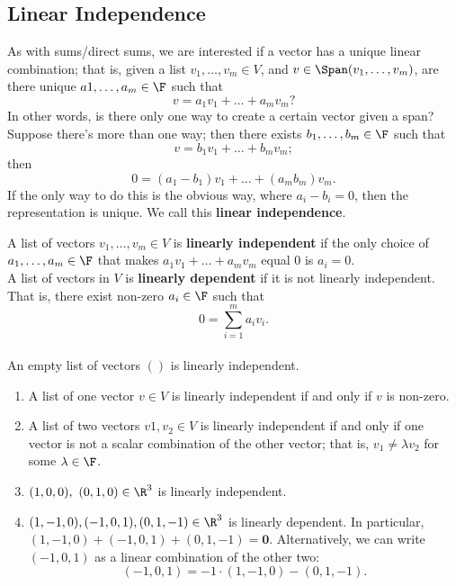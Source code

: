 \documentclass[math0540-lecture-notes.tex]{subfiles}
\begin{document}
\subsection{Linear Independence}

As with sums/direct sums, we are interested if a vector has a unique linear combination; that is,
given a list $v_1,\ldots,v_m\in V$, and $v\in \Span(v_1,\ldots,v_m)$, are there unique $a
1,\ldots,a_m\in \F$ such that \[
  v=a_1v_1+\ldots+a_mv_m
?\] In other words, is there only one way to create a certain vector given a span? Suppose there's
more than one way; then there exists $ b_1,\ldots,b_m\in \F$ such that \[
  v=b_1v_1+\ldots+b_mv_m
;\] then \[
  0 = (a_1-b_1)v_1+\ldots+(a_mb_m)v_m
.\] If the only way to do this is the obvious way, where $a_i-b_i=0$, then the representation is
unique. We call this \textbf{linear independence}.

\begin{definition}{}
  A list of vectors $ v_1,\ldots,v_m\in V$ is \textbf{linearly independent} if the only choice of $
  a_1,\ldots,a_m\in \F$ that makes $  a_1v_1+\ldots+a_mv_m$  equal $0 $ is $a_i=0$.\\

  A list of vectors in $V$ is \textbf{linearly dependent} if it is not linearly independent. That
  is, there exist non-zero $a_i \in \F$ such that \[
    0 = \sum_{i=1}^{m} a_iv_i
  .\]\\ 

  An empty list of vectors $()$ is linearly independent.
\end{definition}
\begin{example}
  \begin{enumerate}
    \item A list of one vector $v\in V$ is linearly independent if and only if $v$ is non-zero.
    \item A list of two vectors $v1,v_2\in V$ is linearly independent if and only if one vector is
      not a scalar combination of the other vector; that is, $ v_1\neq \lambda v_2$ for some $
      \lambda\in \F$.
    \item $(1,0,0),\ (0,1,0)\in \R^3$ is linearly independent.
    \item $(1,-1,0), (-1,0,1), (0,1,-1)\in \R^3$ is linearly dependent. In particular,
      $(1,-1,0)+(-1,0,1)+(0,1,-1)=\textbf{0}$. Alternatively, we can write $(-1,0,1)$ as a linear
      combination of the other two: \[
        (-1,0,1) = -1\cdot (1,-1,0) -(0,1,-1)
      .\] 
  \end{enumerate}
\end{example}
\end{document}
